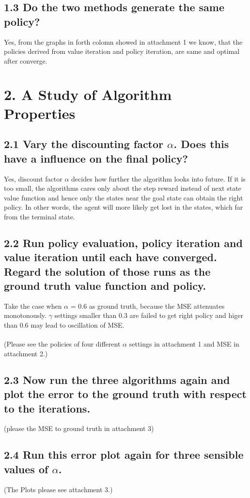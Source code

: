 \documentclass[12pt,a4paper,titlepage]{article}
\begin{document}
\subsection*{1.3 Do the two methods generate the same policy?}
Yes, from the graphs in forth colomn showed in attachment 1 we know, that the policies derived from value iteration and policy iteration, are same and optimal after converge.

\section*{2. A Study of Algorithm Properties}
\subsection*{2.1 Vary the discounting factor $\alpha$. Does this have a influence on the final policy?}
Yes, discount factor $\alpha$ decides how further the algorithm looks into future. If it is too small, the algorithms cares only about the step reward instead of next state value function and hence only the states near the goal state can obtain the right policy. In other words, the agent will more likely get lost in the states, which far from the terminal state.
\subsection*{2.2 Run policy evaluation, policy iteration and value iteration until each have converged. Regard the solution of those runs as the ground truth value function and policy.}
Take the case when $\alpha$ = 0.6 as ground truth, because the MSE attenuates monotonously. $\gamma$ settings smaller than 0.3 are failed to get right policy and higer than 0.6 may lead to oscillation of MSE.\\\\
(Please see the policies of four different $\alpha$ settings in attachment 1 and MSE in attachment 2.)
\subsection*{2.3 Now run the three algorithms again and plot the error to the ground truth with respect to the iterations.}
(please the MSE to ground truth in attachment 3)
\subsection*{2.4 Run this error plot again for three sensible values of $\alpha$.}
(The Plots please see attachment 3.)
\newpage
\end{document}
